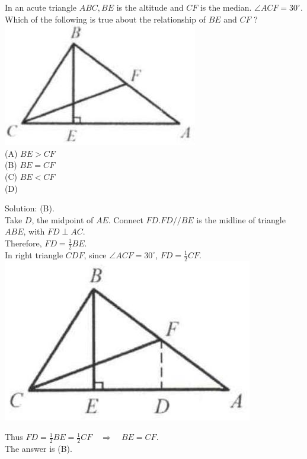 \documentclass{article}
\begin{document}
In an acute triangle \(A B C, B E\) is the altitude and \(C F\) is the median. \(\angle A C F=30^{\circ}\). Which of the following is true about the relationship of \(B E\) and \(C F\) ?\\
\centering
\includegraphics[width=\textwidth]{images/035.jpg}\\
(A) \(B E>C F\)\\
(B) \(B E=C F\)\\
(C) \(B E<C F\)\\
(D)

Solution: (B).\\
Take \(D\), the midpoint of \(A E\). Connect \(F D . F D / / B E\) is the midline of triangle \(A B E\), with \(F D \perp A C\).\\
Therefore, \(F D=\frac{1}{2} B E\).\\
In right triangle \(C D F\), since \(\angle A C F=30^{\circ}\), \(F D=\frac{1}{2} C F\).\\
\centering
\includegraphics[width=\textwidth]{images/036(2).jpg}

Thus \(F D=\frac{1}{2} B E=\frac{1}{2} C F \quad \Rightarrow \quad B E=C F\).\\
The answer is (B).\\
\end{document}
